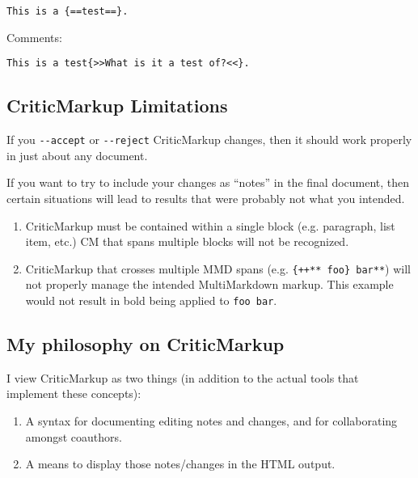 \begin{verbatim}
This is a {==test==}.
\end{verbatim}

Comments:

\begin{verbatim}
This is a test{>>What is it a test of?<<}.
\end{verbatim}

\subsection{CriticMarkup Limitations }
\label{criticmarkuplimitations}

If you \texttt{-{}-accept} or \texttt{-{}-reject} CriticMarkup changes, then it should work properly in just about any document.

If you want to try to include your changes as ``notes'' in the final document, then certain situations will lead to results that were probably not what you intended.

\begin{enumerate}
\item CriticMarkup must be contained within a single block (e.g. paragraph, list item, etc.) CM that spans multiple blocks will not be recognized.

\item CriticMarkup that crosses multiple \gls{MMD} spans (e.g. \texttt{\{++** foo\} bar**}) will not properly manage the intended MultiMarkdown markup. This example would not result in bold being applied to \texttt{foo bar}.

\end{enumerate}

\subsection{My philosophy on CriticMarkup}
\label{myphilosophyoncriticmarkup}

I view CriticMarkup as two things (in addition to the actual tools that implement these concepts):

\begin{enumerate}
\item A syntax for documenting editing notes and changes, and for collaborating amongst coauthors.

\item A means to display those notes\slash changes in the HTML output.

\end{enumerate}

